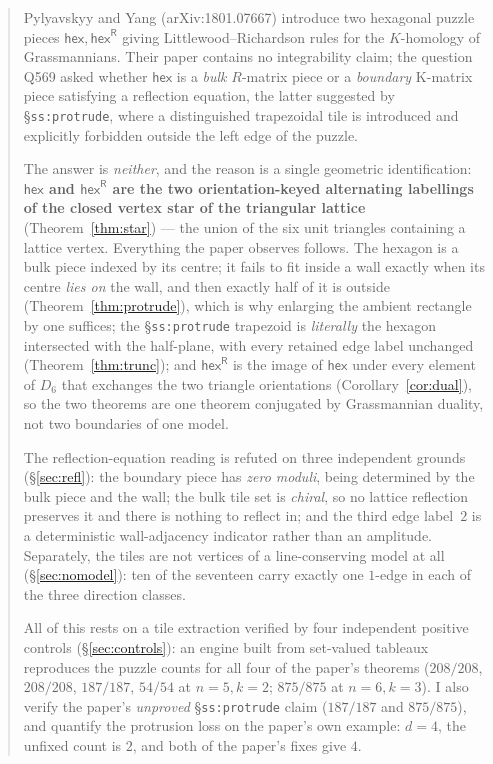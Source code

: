 \documentclass[11pt]{article}
\theoremstyle{definition}
\newcommand{\hex}{\mathsf{hex}}
\newcommand{\hexR}{\mathsf{hex}^{\mathsf{R}}}
\begin{document}
\begin{abstract}
Pylyavskyy and Yang (arXiv:1801.07667) introduce two hexagonal puzzle pieces
$\hex,\hexR$ giving Littlewood--Richardson rules for the $K$-homology of
Grassmannians. Their paper contains no integrability claim; the question Q569
asked whether $\hex$ is a \emph{bulk} $R$-matrix piece or a \emph{boundary}
K-matrix piece satisfying a reflection equation, the latter suggested by
\S\texttt{ss:protrude}, where a distinguished trapezoidal tile is introduced and
explicitly forbidden outside the left edge of the puzzle.

The answer is \emph{neither}, and the reason is a single geometric
identification: \textbf{$\hex$ and $\hexR$ are the two orientation-keyed
alternating labellings of the closed vertex star of the triangular lattice}
(Theorem~\ref{thm:star}) --- the union of the six unit triangles containing a
lattice vertex. Everything the paper observes follows. The hexagon is a bulk
piece indexed by its centre; it fails to fit inside a wall exactly when its
centre \emph{lies on} the wall, and then exactly half of it is outside
(Theorem~\ref{thm:protrude}), which is why enlarging the ambient rectangle by
one suffices; the \S\texttt{ss:protrude} trapezoid is \emph{literally} the
hexagon intersected with the half-plane, with every retained edge label
unchanged (Theorem~\ref{thm:trunc}); and $\hexR$ is the image of $\hex$ under
every element of $D_6$ that exchanges the two triangle orientations
(Corollary~\ref{cor:dual}), so the two theorems are one theorem conjugated by
Grassmannian duality, not two boundaries of one model.

The reflection-equation reading is refuted on three independent grounds
(\S\ref{sec:refl}): the boundary piece has \emph{zero moduli}, being determined
by the bulk piece and the wall; the bulk tile set is \emph{chiral}, so no
lattice reflection preserves it and there is nothing to reflect in; and the
third edge label~$2$ is a deterministic wall-adjacency indicator rather than an
amplitude. Separately, the tiles are not vertices of a line-conserving model at
all (\S\ref{sec:nomodel}): ten of the seventeen carry exactly one $1$-edge in
each of the three direction classes.

All of this rests on a tile extraction verified by four independent positive
controls (\S\ref{sec:controls}): an engine built from set-valued tableaux
reproduces the puzzle counts for all four of the paper's theorems
($208/208$, $208/208$, $187/187$, $54/54$ at $n=5,k=2$; $875/875$ at
$n=6,k=3$). I also verify the paper's \emph{unproved} \S\texttt{ss:protrude}
claim ($187/187$ and $875/875$), and quantify the protrusion loss on the
paper's own example: $d=4$, the unfixed count is $2$, and both of the paper's
fixes give $4$.
\end{abstract}
\end{document}
